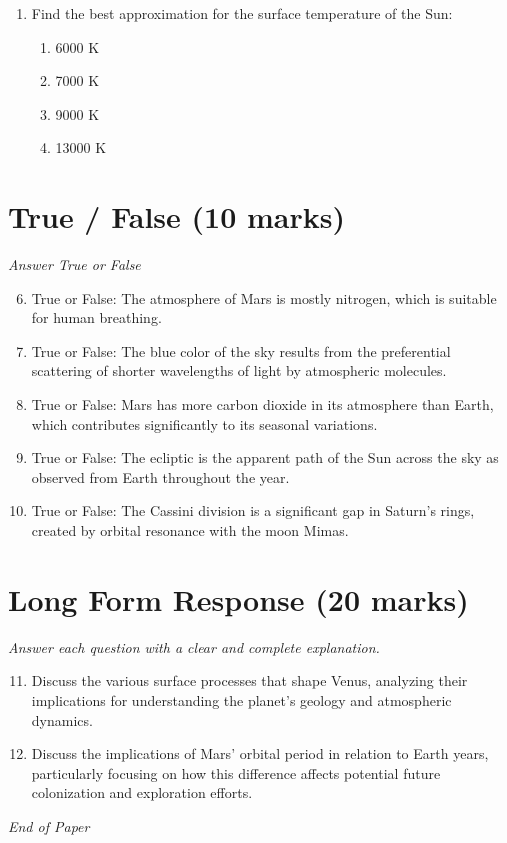 \documentclass[12pt]{article}
\begin{document}
\begin{enumerate}[label=\arabic*.]
\begin{enumerate}[label=(\alph*)]
    \item m*v
    \item 0.5*m/($R^3$)
    \item 0.5*m*(2 GM/R)
    \item 0.6*G($M^2$)/R
\end{enumerate}
\item Find the best approximation for the surface temperature of the Sun:
\begin{enumerate}[label=(\alph*)]
    \item 6000 K
    \item 7000 K
    \item 9000 K
    \item 13000 K
\end{enumerate}
\end{enumerate}

\section*{True / False (10 marks)}
\textit{Answer True or False}
\begin{enumerate}[label=\arabic*.]
\setcounter{enumi}{5}
\item True or False: The atmosphere of Mars is mostly nitrogen, which is suitable for human breathing.
\item True or False: The blue color of the sky results from the preferential scattering of shorter wavelengths of light by atmospheric molecules.
\item True or False: Mars has more carbon dioxide in its atmosphere than Earth, which contributes significantly to its seasonal variations.
\item True or False: The ecliptic is the apparent path of the Sun across the sky as observed from Earth throughout the year.
\item True or False: The Cassini division is a significant gap in Saturn's rings, created by orbital resonance with the moon Mimas.
\end{enumerate}

\section*{Long Form Response (20 marks)}
\textit{Answer each question with a clear and complete explanation.}
\begin{enumerate}[label=\arabic*.]
\setcounter{enumi}{10}
\item Discuss the various surface processes that shape Venus, analyzing their implications for understanding the planet's geology and atmospheric dynamics.
\item Discuss the implications of Mars' orbital period in relation to Earth years, particularly focusing on how this difference affects potential future colonization and exploration efforts.
\end{enumerate}

\vfill
\noindent\textit{End of Paper}
\end{document}
